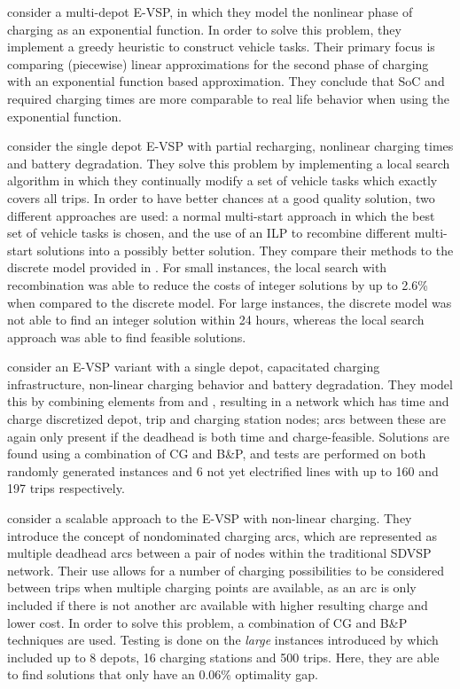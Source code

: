 \documentclass[]{article}
\begin{document}
\citet{Olsen2020} consider a multi-depot E-VSP, in which they model the nonlinear phase of charging as an exponential function. In order to solve this problem, they implement a greedy heuristic to construct vehicle tasks. Their primary focus is comparing (piecewise) linear approximations for the second phase of charging with an exponential function based approximation. They conclude that SoC and required charging times are more comparable to real life behavior when using the exponential function.

 consider the single depot E-VSP with partial recharging, nonlinear charging times and battery degradation. They solve this problem by implementing a local search algorithm in which they continually modify a set of vehicle tasks which exactly covers all trips. In order to have better chances at a good quality solution, two different approaches are used: a normal multi-start approach in which the best set of vehicle tasks is chosen, and the use of an ILP to recombine different multi-start solutions into a possibly better solution. They compare their methods to the discrete model provided in \citet{vanKootenNiekerk2017}. For small instances, the local search with recombination was able to reduce the costs of integer solutions by up to 2.6\% when compared to the discrete model. For large instances, the discrete model was not able to find an integer solution within 24 hours, whereas the local search approach was able to find feasible solutions.

\citet{Zhang2021} consider an E-VSP variant with a single depot, capacitated charging infrastructure, non-linear charging behavior and battery degradation. They model this by combining elements from \citet{Li2014} and \citet{vanKootenNiekerk2017}, resulting in a network which has time and charge discretized depot, trip and charging station nodes; arcs between these are again only present if the deadhead is both time and charge-feasible. Solutions are found using a combination of CG and B\&P, and tests are performed on both randomly generated instances and 6 not yet electrified lines with up to 160 and 197 trips respectively.

\citet{Parmentier2023} consider a scalable approach to the E-VSP with non-linear charging. They introduce the concept of nondominated charging arcs, which are represented as multiple deadhead arcs between a pair of nodes within the traditional SDVSP network. Their use allows for a number of charging possibilities to be considered between trips when multiple charging points are available, as an arc is only included if there is not another arc available with higher resulting charge and lower cost. In order to solve this problem, a combination of CG and B\&P techniques are used. Testing is done on the \textit{large} instances introduced by \citet{Wen2016} which included up to 8 depots, 16 charging stations and 500 trips. Here, they are able to find solutions that only have an 0.06\% optimality gap.
\end{document}
